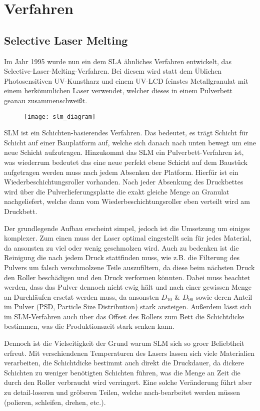 \documentclass[main.tex]{subfiles}
\begin{document}
\section{Verfahren}
\subsection{Selective Laser Melting}
Im Jahr 1995 wurde nun ein dem SLA ähnliches Verfahren entwickelt, das Selective-Laser-Melting-Verfahren. Bei diesem wird statt dem Üblichen Photosensitiven UV-Kunstharz und einem UV-LCD feinstes Metallgranulat mit einem herkömmlichen Laser verwendet, welcher dieses in einem Pulverbett geanau zusammenschweißt. \parencite{3FAKTUR_1}
\begin{figure}[H]
\begin{center}
	\texttt{[image: slm\_diagram]}
	\label{img:slm_diagram}
\end{center}
\end{figure}	
SLM ist ein Schichten-basierendes Verfahren. Das bedeutet, es trägt Schicht für Schicht auf
einer Bauplatform auf, welche sich danach nach unten bewegt um eine neue Schicht aufzutragen. 
Hinzukommt das SLM ein Pulverbett-Verfahren ist, was wiederrum bedeutet das eine neue perfekt ebene Schicht auf dem Baustück aufgetragen werden muss nach jedem Absenken der Platform.
Hierfür ist ein Wiederbeschichtungsroller vorhanden. Nach jeder Absenkung des Druckbettes wird über die Pulverlieferungsplatte die exakt gleiche Menge an Granulat nachgeliefert, welche dann vom Wiederbeschichtungsroller eben verteilt wird am Druckbett. 

Der grundlegende Aufbau erscheint simpel, jedoch ist die Umsetzung um einiges komplexer.
Zum einen muss der Laser optimal eingestellt sein für jedes Material, da ansonsten zu viel oder wenig geschmolzen wird.
Auch zu bedenken ist die Reinigung die nach jedem Druck stattfinden muss, wie z.B. die Filterung des Pulvers um falsch verschmolzene Teile auszufiltern, da diese beim nächsten Druck den Roller beschädigen und den Druck verformen könnten. Dabei muss beachtet werden, dass das Pulver dennoch nicht ewig hält und nach einer gewissen Menge an Durchläufen ersetzt werden muss, da ansonsten $D_{10}$ \& $D_{90}$ sowie deren Anteil im Pulver (PSD, Particle Size Distribution) stark ansteigen. \parencite{YI2021524} Außerdem lässt sich im SLM-Verfahren auch über das Offset des Rollers zum Bett die Schichtdicke bestimmen, was die Produktionszeit stark senken kann.

Dennoch ist die Vielseitigkeit der Grund warum SLM sich so groer Beliebtheit erfreut. Mit verschiendenen Temperaturen des Lasers lassen sich viele Materialien verarbeiten, die Schichtdicke bestimmt auch direkt die Druckdauer, da dickere Schichten zu weniger benötigten Schichten führen, was die Menge an Zeit die durch den Roller verbraucht wird verringert.
Eine solche Veränderung führt aber zu detail-loseren und gröberen Teilen, welche  nach-bearbeitet werden müssen (polieren, schleifen, drehen, etc.). 
\end{document}
